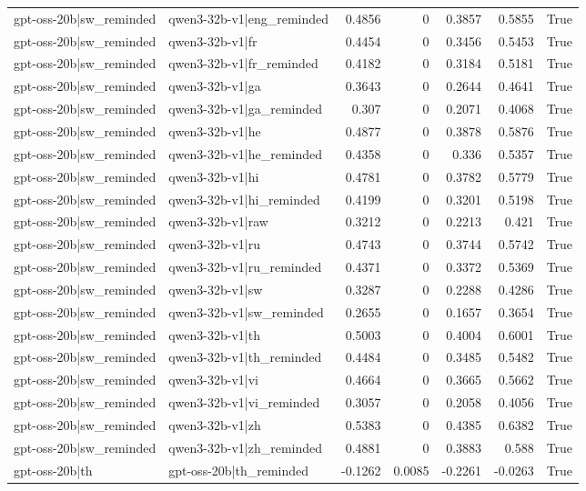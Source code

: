 \begin{table}
\begin{tabular}{l l r r r r l}
gpt-oss-20b|sw_reminded & qwen3-32b-v1|eng_reminded & 0.4856 & 0 & 0.3857 & 0.5855 & True \\
gpt-oss-20b|sw_reminded & qwen3-32b-v1|fr & 0.4454 & 0 & 0.3456 & 0.5453 & True \\
gpt-oss-20b|sw_reminded & qwen3-32b-v1|fr_reminded & 0.4182 & 0 & 0.3184 & 0.5181 & True \\
gpt-oss-20b|sw_reminded & qwen3-32b-v1|ga & 0.3643 & 0 & 0.2644 & 0.4641 & True \\
gpt-oss-20b|sw_reminded & qwen3-32b-v1|ga_reminded & 0.307 & 0 & 0.2071 & 0.4068 & True \\
gpt-oss-20b|sw_reminded & qwen3-32b-v1|he & 0.4877 & 0 & 0.3878 & 0.5876 & True \\
gpt-oss-20b|sw_reminded & qwen3-32b-v1|he_reminded & 0.4358 & 0 & 0.336 & 0.5357 & True \\
gpt-oss-20b|sw_reminded & qwen3-32b-v1|hi & 0.4781 & 0 & 0.3782 & 0.5779 & True \\
gpt-oss-20b|sw_reminded & qwen3-32b-v1|hi_reminded & 0.4199 & 0 & 0.3201 & 0.5198 & True \\
gpt-oss-20b|sw_reminded & qwen3-32b-v1|raw & 0.3212 & 0 & 0.2213 & 0.421 & True \\
gpt-oss-20b|sw_reminded & qwen3-32b-v1|ru & 0.4743 & 0 & 0.3744 & 0.5742 & True \\
gpt-oss-20b|sw_reminded & qwen3-32b-v1|ru_reminded & 0.4371 & 0 & 0.3372 & 0.5369 & True \\
gpt-oss-20b|sw_reminded & qwen3-32b-v1|sw & 0.3287 & 0 & 0.2288 & 0.4286 & True \\
gpt-oss-20b|sw_reminded & qwen3-32b-v1|sw_reminded & 0.2655 & 0 & 0.1657 & 0.3654 & True \\
gpt-oss-20b|sw_reminded & qwen3-32b-v1|th & 0.5003 & 0 & 0.4004 & 0.6001 & True \\
gpt-oss-20b|sw_reminded & qwen3-32b-v1|th_reminded & 0.4484 & 0 & 0.3485 & 0.5482 & True \\
gpt-oss-20b|sw_reminded & qwen3-32b-v1|vi & 0.4664 & 0 & 0.3665 & 0.5662 & True \\
gpt-oss-20b|sw_reminded & qwen3-32b-v1|vi_reminded & 0.3057 & 0 & 0.2058 & 0.4056 & True \\
gpt-oss-20b|sw_reminded & qwen3-32b-v1|zh & 0.5383 & 0 & 0.4385 & 0.6382 & True \\
gpt-oss-20b|sw_reminded & qwen3-32b-v1|zh_reminded & 0.4881 & 0 & 0.3883 & 0.588 & True \\
gpt-oss-20b|th & gpt-oss-20b|th_reminded & -0.1262 & 0.0085 & -0.2261 & -0.0263 & True \\

\end{tabular}
\end{table}
